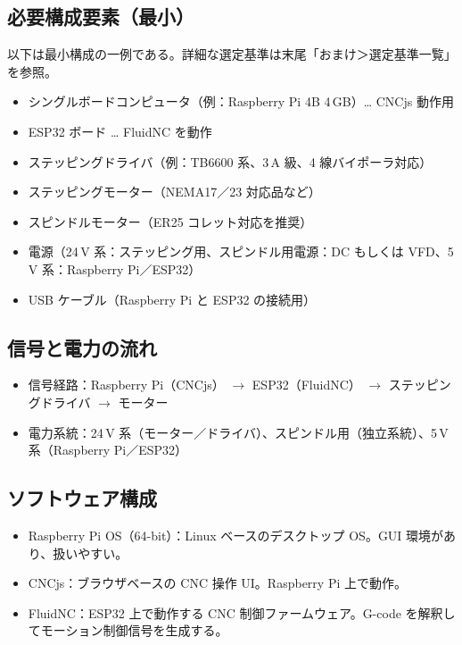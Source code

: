 \documentclass[uplatex,dvipdfmx]{ujarticle}
\begin{document}
\subsection{必要構成要素（最小）}

以下は最小構成の一例である。詳細な選定基準は末尾「おまけ＞選定基準一覧」を参照。

\begin{itemize}
  \item シングルボードコンピュータ（例：Raspberry Pi 4B 4\,GB）… CNCjs 動作用
  \item ESP32 ボード … FluidNC を動作
  \item ステッピングドライバ（例：TB6600 系、3\,A 級、4 線バイポーラ対応）
  \item ステッピングモーター（NEMA17／23 対応品など）
  \item スピンドルモーター（ER25 コレット対応を推奨）
  \item 電源（24\,V 系：ステッピング用、スピンドル用電源：DC もしくは VFD、5\,V 系：Raspberry Pi／ESP32）
  \item USB ケーブル（Raspberry Pi と ESP32 の接続用）
\end{itemize}

\subsection{信号と電力の流れ}

\begin{itemize}
  \item 信号経路：Raspberry Pi（CNCjs） $\to$ ESP32（FluidNC） $\to$ ステッピングドライバ $\to$ モーター
  \item 電力系統：24\,V 系（モーター／ドライバ）、スピンドル用（独立系統）、5\,V 系（Raspberry Pi／ESP32）
\end{itemize}

\subsection{ソフトウェア構成}

\begin{itemize}
  \item Raspberry Pi OS（64-bit）：Linux ベースのデスクトップ OS。GUI 環境があり、扱いやすい。
  \item CNCjs：ブラウザベースの CNC 操作 UI。Raspberry Pi 上で動作。
  \item FluidNC：ESP32 上で動作する CNC 制御ファームウェア。G-code を解釈してモーション制御信号を生成する。
\end{itemize}
\end{document}
